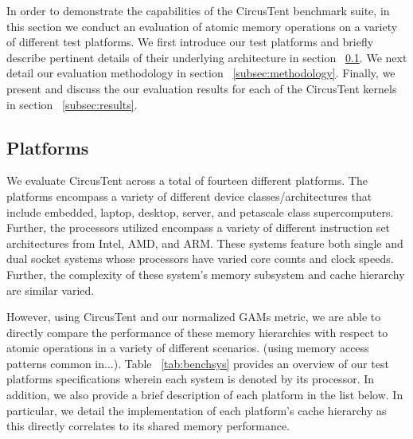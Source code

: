 
In order to demonstrate the capabilities of the CircusTent benchmark suite, in this section we conduct an evaluation of atomic memory operations on a variety of different test platforms.
We first introduce our test platforms and briefly describe pertinent details of their underlying architecture in section ~\ref{subsec:platforms}.
We next detail our evaluation methodology in section ~\ref{subsec:methodology}.
Finally, we present and discuss the our evaluation results for each of the CircusTent kernels in section ~\ref{subsec:results}.

\subsection{Platforms}
\label{subsec:platforms}

We evaluate CircusTent across a total of fourteen different platforms.
The platforms encompass a variety of different device classes/architectures that include embedded, laptop, desktop, server, and petascale class supercomputers.
Further, the processors utilized encompass a variety of different instruction set architectures from Intel, AMD, and ARM.
These systems feature both single and dual socket systems whose processors have varied core counts and clock speeds.
Further, the complexity of these system's memory subsystem and cache hierarchy are similar varied.

However, using CircusTent and our normalized GAMs metric, we are able to directly compare the performance of these memory hierarchies with respect to atomic operations in a variety of different scenarios. (using memory access patterns common in...).
Table ~\ref{tab:benchsys} provides an overview of our test platforms specifications wherein each system is denoted by its processor.
In addition, we also provide a brief description of each platform in the list below.
In particular, we detail the implementation of each platform's cache hierarchy as this directly correlates to its shared memory performance. 

